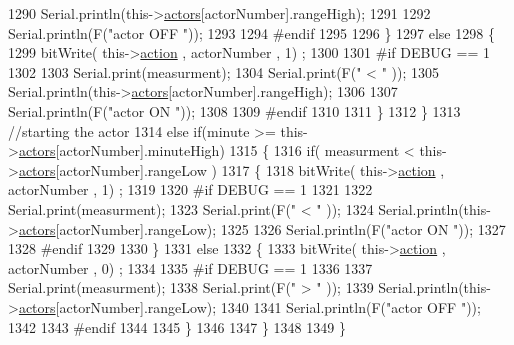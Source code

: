 \begin{DoxyCode}
1290                 Serial.println(this->\hyperlink{class_jetpack_a7e16d2f97837f9712a2e6de1c50d99db}{actors}[actorNumber].rangeHigh);
1291 
1292                 Serial.println(F(\textcolor{stringliteral}{"actor OFF "}));
1293 
1294 \textcolor{preprocessor}{            #endif}
1295     
1296             \}
1297             \textcolor{keywordflow}{else} 
1298             \{
1299                 bitWrite( this->\hyperlink{class_jetpack_aca3142925a7b0834b34ae91d26af7765}{action} , actorNumber , 1) ;
1300 
1301 \textcolor{preprocessor}{            #if DEBUG == 1 }
1302 
1303                 Serial.print(measurment);
1304                 Serial.print(F(\textcolor{stringliteral}{" < "} ));
1305                 Serial.println(this->\hyperlink{class_jetpack_a7e16d2f97837f9712a2e6de1c50d99db}{actors}[actorNumber].rangeHigh);
1306 
1307                 Serial.println(F(\textcolor{stringliteral}{"actor ON "}));
1308 
1309 \textcolor{preprocessor}{            #endif  }
1310                 
1311             \}
1312     \}   
1313     \textcolor{comment}{//starting the actor}
1314     \textcolor{keywordflow}{else} \textcolor{keywordflow}{if}(minute >= this->\hyperlink{class_jetpack_a7e16d2f97837f9712a2e6de1c50d99db}{actors}[actorNumber].minuteHigh)
1315     \{
1316             \textcolor{keywordflow}{if}( measurment < this->\hyperlink{class_jetpack_a7e16d2f97837f9712a2e6de1c50d99db}{actors}[actorNumber].rangeLow )
1317             \{
1318                 bitWrite( this->\hyperlink{class_jetpack_aca3142925a7b0834b34ae91d26af7765}{action} , actorNumber , 1) ;
1319 
1320 \textcolor{preprocessor}{            #if DEBUG == 1 }
1321 
1322                 Serial.print(measurment);
1323                 Serial.print(F(\textcolor{stringliteral}{" < "} ));
1324                 Serial.println(this->\hyperlink{class_jetpack_a7e16d2f97837f9712a2e6de1c50d99db}{actors}[actorNumber].rangeLow);
1325 
1326                 Serial.println(F(\textcolor{stringliteral}{"actor ON "}));
1327 
1328 \textcolor{preprocessor}{            #endif  }
1329 
1330             \}
1331             \textcolor{keywordflow}{else} 
1332             \{
1333                 bitWrite( this->\hyperlink{class_jetpack_aca3142925a7b0834b34ae91d26af7765}{action} , actorNumber , 0) ;
1334             
1335 \textcolor{preprocessor}{            #if DEBUG == 1 }
1336 
1337                 Serial.print(measurment);
1338                 Serial.print(F(\textcolor{stringliteral}{" > "} ));
1339                 Serial.println(this->\hyperlink{class_jetpack_a7e16d2f97837f9712a2e6de1c50d99db}{actors}[actorNumber].rangeLow);
1340 
1341                 Serial.println(F(\textcolor{stringliteral}{"actor OFF "}));
1342 
1343 \textcolor{preprocessor}{            #endif  }
1344                 
1345             \}
1346 
1347     \}
1348 
1349 \}
\end{DoxyCode}
